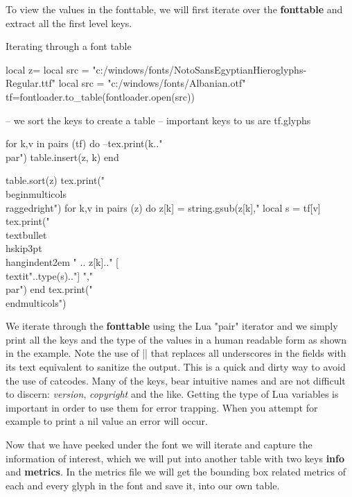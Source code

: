 To view the values in the fonttable, we will first iterate over the \textbf{fonttable} and extract all the first level keys.

\begin{texexample}{Iterating through a font table}{}
\begin{luacode*}
local z={}
local src = "c:/windows/fonts/NotoSansEgyptianHieroglyphs-Regular.ttf"
local src = "c:/windows/fonts/Albanian.otf"
tf=fontloader.to_table(fontloader.open(src))

-- we sort the keys to create a table
-- important keys to us are tf.glyphs

for k,v in pairs (tf) do
   --tex.print(k.."\\par")
   table.insert(z, k)
end

table.sort(z)
tex.print("\\begin{multicols}{3}\\raggedright")
for k,v in pairs (z) do
   z[k] = string.gsub(z[k],"%
   local s = tf[v]
   tex.print("\\textbullet\\hskip3pt\\hangindent2em " .. z[k].." [\\textit{"..type(s).."}] ","\\par")
end
tex.print("\\end{multicols}")
\end{luacode*}
\end{texexample}

We iterate through the \textbf{fonttable} using the Lua  "pair" iterator and we simply print all the keys and the type of the values in a human readable form as shown in the example. Note the use of |\textunderscore| that replaces all underscores in the fields with its text equivalent to sanitize the output. This is a quick and dirty way to avoid the use of catcodes. Many of the keys, bear intuitive names and are not difficult to discern: \textit{version}, \textit{copyright} and the like. Getting the type of Lua variables is important in order to use them for error trapping. When you attempt for example to print a nil value an error will occur.

Now that we have peeked under the font we will iterate and capture the information of interest, which we will put into another table with two keys \textbf{info}  and \textbf{metrics}. In the metrics file we will get the bounding box related metrics of each and every glyph in the font and save it, into our own table. 

